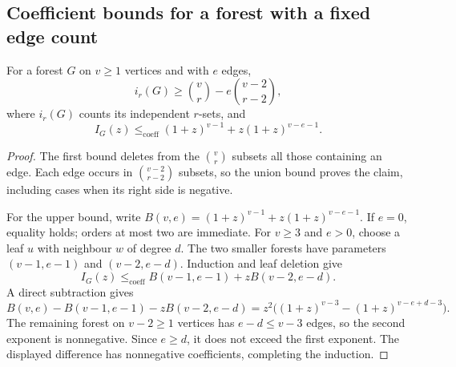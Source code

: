 \subsection{Coefficient bounds for a forest with a fixed edge count}
\label{f60:subsec-edge-bounds}

\begin{lemma}
\label{f60:lem-edge-bounds}
For a forest $G$ on $v\ge1$ vertices and with $e$ edges,
\begin{equation}
 i_r(G)\ge\binom vr-e\binom{v-2}{r-2},
 \label{f60:eq-edge-lower-raw}
\end{equation}
where $i_r(G)$ counts its independent $r$-sets, and
\begin{equation}
 I_G(z)\le_{\mathrm{coeff}}
 (1+z)^{v-1}+z(1+z)^{v-e-1}.
 \label{f60:eq-star-upper}
\end{equation}
\end{lemma}

\begin{proof}
The first bound deletes from the $\binom vr$ subsets all those
containing an edge.  Each edge occurs in $\binom{v-2}{r-2}$ subsets,
so the union bound proves the claim, including cases when its right
side is negative.

For the upper bound, write
$B(v,e)=(1+z)^{v-1}+z(1+z)^{v-e-1}$.
If $e=0$, equality holds; orders at most two are immediate.  For
$v\ge3$ and $e>0$, choose a leaf $u$ with neighbour $w$ of degree $d$.
The two smaller forests have parameters $(v-1,e-1)$ and $(v-2,e-d)$.
Induction and leaf deletion give
\[
 I_G(z)\le_{\mathrm{coeff}}B(v-1,e-1)+zB(v-2,e-d).
\]
A direct subtraction gives
\[
 B(v,e)-B(v-1,e-1)-zB(v-2,e-d)
 =z^2\bigl((1+z)^{v-3}-(1+z)^{v-e+d-3}\bigr).
\]
The remaining forest on $v-2\ge1$ vertices has $e-d\le v-3$ edges,
so the second exponent is nonnegative.  Since $e\ge d$, it does not
exceed the first exponent.  The displayed difference has nonnegative
coefficients, completing the induction.
\end{proof}

